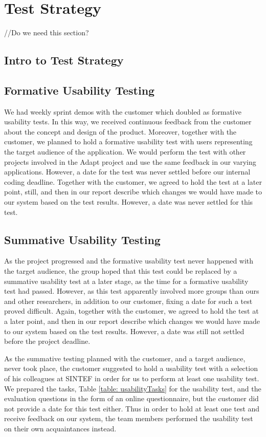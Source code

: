 \chapter{Test Strategy}
//Do we need this section?
\section{Intro to Test Strategy}
\section{Formative Usability Testing}
We had weekly sprint demos with the customer which doubled as formative usability tests. In this way, we received continuous feedback from the customer about the concept and design of the product.
Moreover, together with the customer, we planned to hold a formative usability test with users representing the target audience of the application. We would perform the test with other projects involved in the Adapt project and use the same feedback in our varying applications. However, a date for the test was never settled before our internal coding deadline. Together with the customer, we agreed to hold the test at a later point, still, and then in our report describe which changes we would have made to our system based on the test results. 
However, a date was never settled for this test.
\section{Summative Usability Testing}
As the project progressed and the formative usability test never happened with the target audience, the group hoped that this test could be replaced by a summative usability test at a later stage, as the time for a formative usability test had passed.
However, as this test apparently involved more groups than ours and other researchers, in addition to our customer, fixing a date for such a test proved difficult. Again, together with the customer, we agreed to hold the test at a later point, and then in our report describe which changes we would have made to our system based on the test results. 
However, a date was still not settled before the project deadline.

As the summative testing planned with the customer, and a target audience, never took place, the customer suggested to hold a usability test with a selection of his colleagues at SINTEF in order for us to perform at least one usability test. We prepared the tasks, Table \ref{table: usabilityTasks} for the usability test, and the evaluation questions in the form of an online questionnaire, but the customer did not provide a date for this test either. Thus in order to hold at least one test and receive feedback on our system, the team members performed the usability test on their own acquaintances instead.

